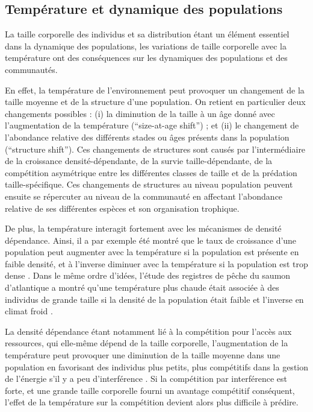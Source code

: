 \subsection{Température et dynamique des populations}

La taille corporelle des individus et sa distribution étant un élément essentiel
dans la dynamique des populations, les variations de taille corporelle avec la
température ont des conséquences sur les dynamiques des populations et des
communautés. 

En effet, la température de l'environnement peut provoquer un changement de la
taille moyenne et de la structure d'une population. On retient en particulier
deux changements possibles : (i) la diminution de la taille à un âge donné avec
l'augmentation de la température (``size-at-age shift'') ; et (ii) le
changement de l'abondance relative des différents stades ou âges présents dans
la population (``structure shift''). Ces changements de structures sont causés
par l'intermédiaire de la croissance densité-dépendante, de la survie
taille-dépendante, de la compétition asymétrique entre les différentes
classes de taille et de la prédation taille-spécifique. Ces changements de
structures au niveau population peuvent ensuite se répercuter au niveau de la
communauté en affectant l'abondance relative de ses différentes espèces et son
organisation trophique. 

De plus, la température interagit fortement avec les mécanismes de densité
dépendance. Ainsi, il a par exemple été montré que le taux de croissance d'une
population peut augmenter avec la température si la population est présente en
faible densité, et à l'inverse diminuer avec la température si la population est
trop dense \autocites[chez le saumon royal][]{crozier2010a}. Dans le même
ordre d'idées, l'étude des registres de pêche du saumon d'atlantique a montré
qu'une température plus chaude était associée à des individus de grande taille si la
densité de la population était faible et l'inverse en climat froid
\autocites{huusko2012a}. 

La densité dépendance étant notamment lié à la compétition pour l'accès aux
ressources, qui elle-même dépend de la taille corporelle, l'augmentation de la
température peut provoquer une diminution de la taille moyenne dans une
population en favorisant des individus plus petits, plus compétitifs dans la
gestion de l'énergie s'il y a peu d'interférence
\autocites{persson1998a,ohlberger2012a}. Si la compétition par interférence est
forte, et une grande taille corporelle fourni un avantage compétitif conséquent,
l'effet de la température sur la compétition devient alors plus difficile à
prédire.

